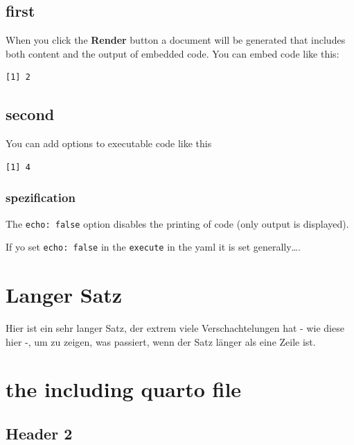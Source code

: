 \documentclass[
  11pt,
]{scrbook}
\begin{document}
\hypertarget{first}{%
\section{first}\label{first}}

When you click the \textbf{Render} button a document will be generated
that includes both content and the output of embedded code. You can
embed code like this:

\begin{verbatim}
[1] 2
\end{verbatim}

\hypertarget{second}{%
\section{second}\label{second}}

You can add options to executable code like this

\begin{verbatim}
[1] 4
\end{verbatim}

\hypertarget{spezification}{%
\subsection{spezification}\label{spezification}}

The \texttt{echo:\ false} option disables the printing of code (only
output is displayed).

If yo set \texttt{echo:\ false} in the \texttt{execute} in the yaml it
is set generally\ldots.

\hypertarget{langer-satz}{%
\chapter{Langer Satz}\label{langer-satz}}

Hier ist ein sehr langer Satz, der extrem viele Verschachtelungen hat -
wie diese hier -, um zu zeigen, was passiert, wenn der Satz länger als
eine Zeile ist.

\hypertarget{the-including-quarto-file}{%
\chapter{the including quarto file}\label{the-including-quarto-file}}

\newpage{}

\hypertarget{header-2}{%
\section{Header 2}\label{header-2}}
\end{document}
